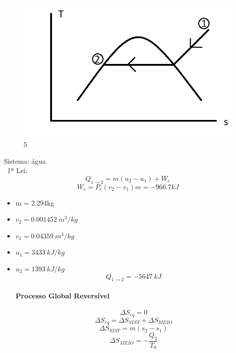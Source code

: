 \documentclass[a4paper, 12pt]{article}
\begin{document}
\begin{figure}[h]
\begin{center}
\includegraphics[scale=0.38]{./fig/5.png}
\caption{\label{fig:4}5} 
\end{center}
\end{figure}

Sistema:  água\\\ 1ª Lei: 
\[Q_{1 \rightarrow 2}=m(u_{2}-u_{1})+W_{e}\]
\[W_{e}=P_{e}(v_{2}-v_{1})m=-966.7kJ\]
\begin{itemize}
\item m = 2.294kg
\item $v_{2}=0.001452\ m^{3}/kg$
\item $v_{1}=0.04359\ m^{3}/kg$
\item $u_{1}=3433\ kJ/kg$
\item $u_{2}=1393\ kJ/kg$
\[Q_{1 \rightarrow 2}=-5647\ kJ\]
\paragraph*{Processo Global Reversível}
\[\Delta S_{eq}=0\]
\[\Delta S_{eq}=\Delta S_{SIST}+\Delta S_{MEIO}\]
\[\Delta S_{SIST}=m(s_{2}-s_{1})\]
\[\Delta S_{MEIO}=-\frac{Q_{2}}{T_{0}}\]

\end{itemize}
\end{document}
